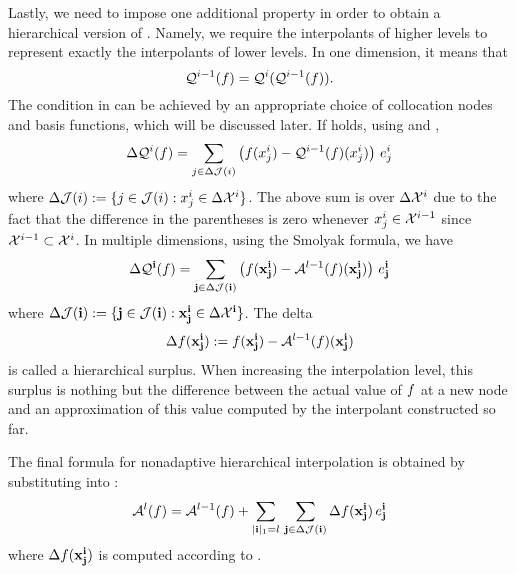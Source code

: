Lastly, we need to impose one additional property in order to obtain a
hierarchical version of . Namely, we require the
interpolants of higher levels to represent exactly the interpolants of lower
levels. In one dimension, it means that
\begin{equation} \elab{tensor-exactness}
  \tensor{i - 1}(\f) = \tensor{i}(\tensor{i - 1}(\f)).
\end{equation}
The condition in  can be achieved by an appropriate
choice of collocation nodes and basis functions, which will be discussed later.
If  holds, using  and
,
\[
  \Delta\mathcal{Q}^{i}(f) = \sum_{j \in \Delta\mathcal{J}(i)} \left( f(x^i_j) - \mathcal{Q}^{i - 1}(f)(x^i_j) \right) \, e^i_j
\]
where $\Delta\mathcal{J}(i) := \{ j \in \mathcal{J}(i): x^i_j \in \Delta\mathcal{X}^i \}$. The
above sum is over $\Delta\mathcal{X}^i$ due to the fact that the difference in the
parentheses is zero whenever $x^i_j \in \mathcal{X}^{i - 1}$ since $\mathcal{X}^{i - 1} \subset
\mathcal{X}^i$. In multiple dimensions, using the Smolyak formula, we have
\begin{equation} \elab{tensor-delta}
  \Delta\tensor{\vi}(\f) = \sum_{\vj \in \Delta\index(\vi)} \left( \f(\vx^\vi_\vj) - \smolyak{l - 1}(\f)(\vx^\vi_\vj) \right) \, \e^\vi_\vj
\end{equation}
where $\Delta\mathcal{J}(\mathbf{i}) := \{ \mathbf{j} \in \mathcal{J}(\mathbf{i}): \mathbf{x}^{\mathbf{i}}_{\mathbf{j}} \in \Delta\mathcal{X}^{\mathbf{i}}
\}$. The delta
\begin{equation} \elab{surplus}
  \surplus(\vx^\vi_\vj) := \f(\vx^\vi_\vj) - \smolyak{l - 1}(\f)(\vx^\vi_\vj)
\end{equation}
is called a hierarchical surplus. When increasing the interpolation level, this
surplus is nothing but the difference between the actual value of $f$ at a new
node and an approximation of this value computed by the interpolant constructed
so far.

The final formula for nonadaptive hierarchical interpolation is obtained by
substituting  into :
\begin{equation} \elab{smolyak-hierarchical}
  \smolyak{l}(\f) = \smolyak{l-1}(\f) + \sum_{|\vi|_1 = l} \, \sum_{\vj \in \Delta\index(\vi)} \surplus(\vx^\vi_\vj) \, \e^\vi_\vj
\end{equation}
where $\Delta f(\mathbf{x}^{\mathbf{i}}_{\mathbf{j}})$ is computed according to .
